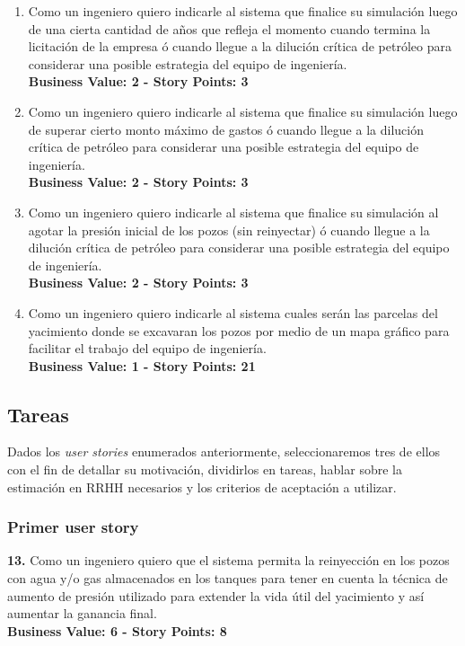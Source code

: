 \begin{enumerate}
  \item Como un ingeniero quiero indicarle al sistema que finalice su simulación luego de una cierta cantidad de años que refleja el momento cuando termina la licitación de la empresa ó cuando llegue a la dilución crítica de petróleo para considerar una posible estrategia del equipo de ingeniería.\\
  \textbf{Business Value: 2 - Story Points: 3}
  
  \item Como un ingeniero quiero indicarle al sistema que finalice su simulación luego de superar cierto monto máximo de gastos ó cuando llegue a la dilución crítica de petróleo para considerar una posible estrategia del equipo de ingeniería.\\
  \textbf{Business Value: 2 - Story Points: 3}
  
  \item Como un ingeniero quiero indicarle al sistema que finalice su simulación al agotar la presión inicial de los pozos (sin reinyectar) ó cuando llegue a la dilución crítica de petróleo para considerar una posible estrategia del equipo de ingeniería.\\
  \textbf{Business Value: 2 - Story Points: 3}
  
  \item Como un ingeniero quiero indicarle al sistema cuales serán las parcelas del yacimiento donde se excavaran los pozos por medio de un mapa gráfico para facilitar el trabajo del equipo de ingeniería.\\
  \textbf{Business Value: 1 - Story Points: 21}
\end{enumerate}


\subsection{Tareas}

Dados los \textit{user stories} enumerados anteriormente, seleccionaremos tres de ellos con el fin de detallar su motivación, dividirlos en tareas, hablar sobre la estimación en RRHH necesarios y los criterios de aceptación a utilizar.

\subsubsection{Primer user story}

\textbf{13.} Como un ingeniero quiero que el sistema permita la reinyección en los pozos con agua y/o gas almacenados en los tanques para tener en cuenta la técnica de aumento de presión utilizado para extender la vida útil del yacimiento y así aumentar la ganancia final.\\
\textbf{Business Value: 6 - Story Points: 8}\\

